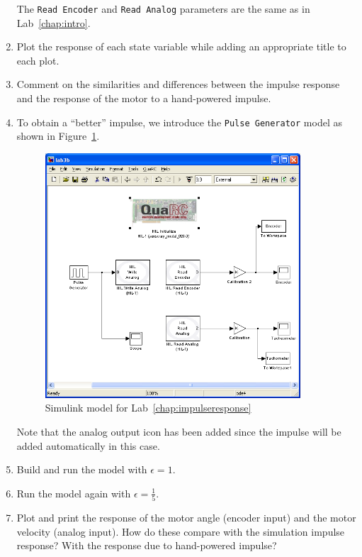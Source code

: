 \begin{enumerate}
          The \verb|Read Encoder| and \verb|Read Analog| parameters are the same as in
          Lab~\ref{chap:intro}\@.

    \item Plot the response of each state variable while adding an appropriate
          title to each plot.

    \item Comment on the similarities and differences between the impulse
          response and the response of the motor to a hand-powered impulse.

    \item To obtain a ``better'' impulse, we introduce the \verb|Pulse Generator|
          model as shown in Figure~\ref{fig:model3b}\@.
          \begin{figure}
              \includegraphics[width=0.9\textwidth]{pix/lab3.PNG}
              \caption{\textsf{Simulink} model for Lab~\ref{chap:impulseresponse}}\label{fig:model3b}
          \end{figure}%
          Note that the analog output icon has been added since the impulse will be
          added automatically in this case.

    \item Build and run the model with \(\epsilon =1\).

    \item Run the model again with \(\epsilon=\frac{1}{5}\).

    \item Plot and print the response of the motor angle (encoder input) and the
          motor velocity (analog input).  How do these compare with the simulation
          impulse response?  With the response due to hand-powered impulse?
\end{enumerate}

